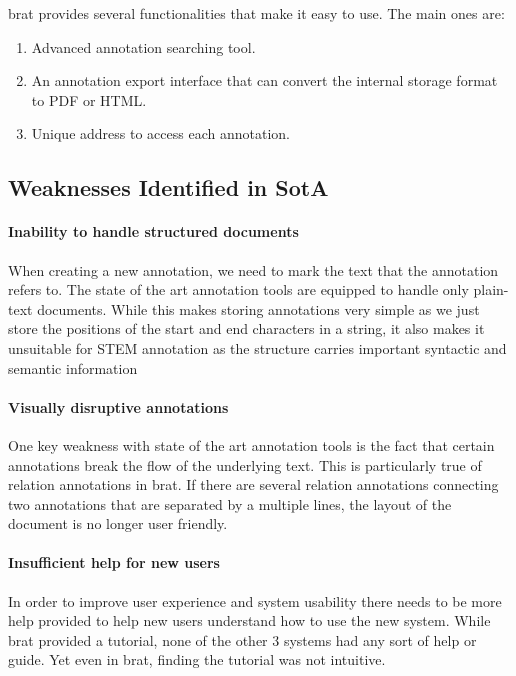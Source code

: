	    brat provides several functionalities that make it easy to use. The main ones are:
	    \begin{enumerate}
	      \item Advanced annotation searching tool.
	      \item An annotation export interface that can convert the internal storage format to PDF or HTML.
	      \item Unique address to access each annotation.
	    \end{enumerate}

  	\subsection{Weaknesses Identified in SotA}
    	\paragraph{Inability to handle structured documents}
    		When creating a new annotation, we need to mark the text that the annotation refers to. The state of the art annotation tools are equipped to handle only plain-text documents. While this makes storing annotations very simple as we just store the positions of the start and end characters in a string, it also makes it unsuitable for STEM annotation as the structure carries important syntactic and semantic information
    	\paragraph{Visually disruptive annotations}
    		One key weakness with state of the art annotation tools is the fact that certain annotations break the flow of the underlying text. This is particularly true of relation annotations in brat. If there are several relation annotations connecting two annotations that are separated by a multiple lines, the layout of the document is no longer user friendly.
    	\paragraph{Insufficient help for new users}
    		In order to improve user experience and system usability there needs to be more help provided to help new users understand how to use the new system. While brat provided a tutorial, none of the other 3 systems had any sort of help or guide. Yet even in brat, finding the tutorial was not intuitive.